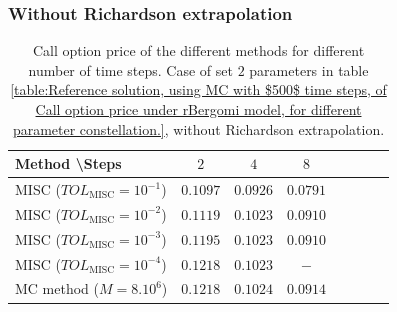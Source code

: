 \subsubsection*{Without Richardson extrapolation}
\begin{table}[h!]
	\centering
	\begin{tabular}{l*{6}{c}r}
		Method \textbackslash  Steps            & $2$ & $4$ & $8$  \\
		\hline
		MISC ($TOL_{\text{MISC}}=10^{-1}$)  &$0.1097$ & $0.0926$ & $0.0791$   \\
		MISC ($TOL_{\text{MISC}}=10^{-2}$)  & $0.1119$&  $0.1023$ & $0.0910$  \\
		MISC ($TOL_{\text{MISC}}=10^{-3}$)        & $0.1195$ &$0.1023$ &   $0.0910$  \\
		MISC ($TOL_{\text{MISC}}=10^{-4}$)        & $0.1218$ &$0.1023$ &  $-$  \\
		\hline
		MC method ($M=8.10^{6}$)   & $0.1218 $  & $0.1024 $  & $0.0914$  \\		
		\hline
	\end{tabular}
	\caption{ Call option price of the different methods for different number of time steps. Case of set $2$ parameters in table \ref{table:Reference solution, using MC with $500$ time steps, of Call option price under rBergomi model, for different parameter constellation.}, without Richardson extrapolation.}
	\label{table: Call option price of the different methods for different number of time steps. Case set 2_linear}
\end{table}




